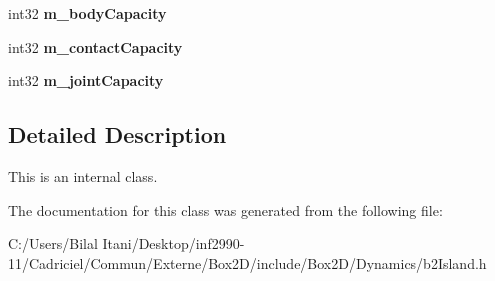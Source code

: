 \begin{DoxyCompactItemize}
\item 
int32 {\bfseries m\+\_\+body\+Capacity}\hypertarget{classb2_island_a5ea371889bb93fb6387ff2ab427191ed}{}\label{classb2_island_a5ea371889bb93fb6387ff2ab427191ed}

\item 
int32 {\bfseries m\+\_\+contact\+Capacity}\hypertarget{classb2_island_a1a65b8fc8256ca443f85e6ae6f2d841a}{}\label{classb2_island_a1a65b8fc8256ca443f85e6ae6f2d841a}

\item 
int32 {\bfseries m\+\_\+joint\+Capacity}\hypertarget{classb2_island_a9b6e63c89307d469e1075585d65a9bbb}{}\label{classb2_island_a9b6e63c89307d469e1075585d65a9bbb}

\end{DoxyCompactItemize}


\subsection{Detailed Description}
This is an internal class. 

The documentation for this class was generated from the following file\+:\begin{DoxyCompactItemize}
\item 
C\+:/\+Users/\+Bilal Itani/\+Desktop/inf2990-\/11/\+Cadriciel/\+Commun/\+Externe/\+Box2\+D/include/\+Box2\+D/\+Dynamics/b2\+Island.\+h\end{DoxyCompactItemize}
